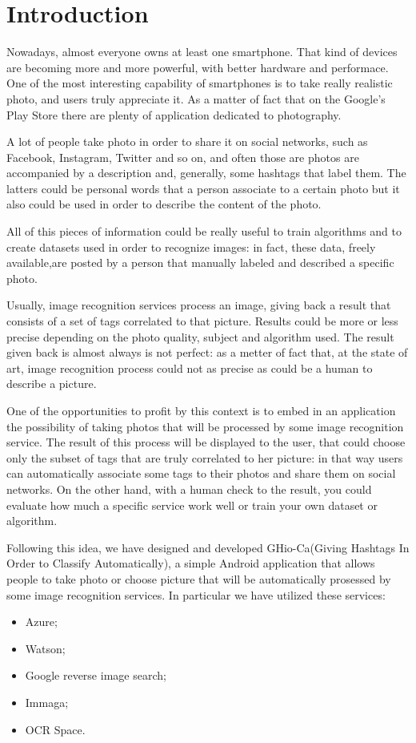 \section{Introduction}


Nowadays, almost everyone owns at least one smartphone. That kind of devices are
becoming more and more powerful, with better hardware and performace. One of the
most interesting capability of smartphones is to take really realistic photo, and
users truly appreciate it. As a matter of fact that on the Google's Play Store 
there are plenty of application dedicated to photography.

A lot of people take photo in order to share it on social networks, such as 
Facebook, Instagram, Twitter and so on, and often those are photos are 
accompanied by a description and, generally, some hashtags that label them. The 
latters could be personal words that a person associate to a certain photo but it
also could be used in order to describe the content of the photo.

All of this pieces of information could be really useful to train algorithms and
to create datasets used in order to recognize images: in fact, these data, freely 
available,are posted by a person that manually labeled and described a specific 
photo.

Usually, image recognition services process an image, giving back a result that 
consists of a set of tags correlated to that picture. Results could be more or 
less precise depending on the photo quality, subject and algorithm used. The 
result given back is almost always is not perfect: as a metter of fact that, at 
the state of art, image recognition process could not as precise as could be a 
human to describe a picture.

One of the opportunities to profit by this context is to embed in an application
the possibility of taking photos that will be processed by some image recognition 
service. The result of this process will be displayed to the user, that could 
choose only the subset of tags that are truly correlated to her picture: in that
way users can automatically associate some tags to their photos and share them on
social networks. On the other hand, with a human check to the result, you could 
evaluate how much a specific service work well or train your own dataset or 
algorithm. 

Following this idea, we have designed and developed GHio-Ca(Giving Hashtags In 
Order to Classify Automatically), a simple Android application that allows people
to take photo or choose picture that will be automatically prosessed by some 
image recognition services. In particular we have utilized these services:
\begin{itemize}
	\item Azure;
	\item Watson;
	\item Google reverse image search;
	\item Immaga;
	\item OCR Space.
\end{itemize}

